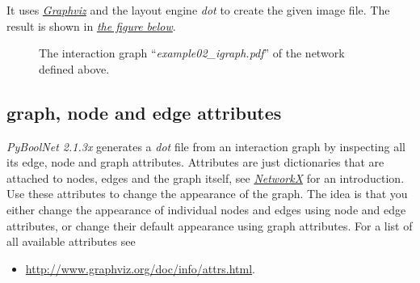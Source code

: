 \documentclass[letterpaper,10pt,english]{sphinxmanual}
\begin{document}
It uses {\hyperref[Installation:installation-graphviz]{\emph{Graphviz}}} and the layout engine \emph{dot} to create the given image file.
The result is shown in {\hyperref[Manual:figure01]{\emph{the figure below}}}.
\begin{figure}[htbp]
\centering
\capstart

\caption{The interaction graph ``\emph{example02\_igraph.pdf}'' of the network defined above.}\label{Manual:figure01}\end{figure}


\subsection{graph, node and edge attributes}
\label{Manual:graph-node-and-edge-attributes}
\emph{PyBoolNet 2.1.3x} generates a \emph{dot} file from an interaction graph by inspecting all its edge, node and graph attributes.
Attributes are just dictionaries that are attached to nodes, edges and the graph itself, see {\hyperref[Installation:installation-networkx]{\emph{NetworkX}}} for an introduction.
Use these attributes to change the appearance of the graph.
The idea is that you either change the appearance of individual nodes and edges using node and edge attributes,
or change their default appearance using graph attributes.
For a list of all available attributes see
\begin{itemize}
\item {} 
\href{http://www.graphviz.org/doc/info/attrs.html}{http://www.graphviz.org/doc/info/attrs.html}.

\end{itemize}
\end{document}
